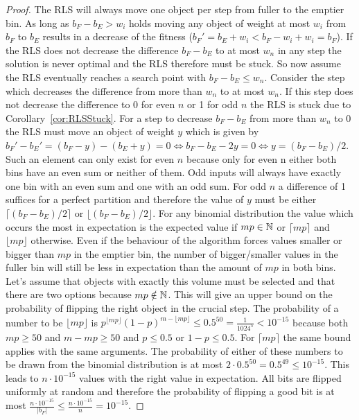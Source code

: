\begin{proof}
    The RLS will always move one object per step from fuller to the emptier bin.
    As long as $b_F-b_E>w_i$ holds moving any object of weight at most $w_i$ from $b_F$ to $b_E$ results in a decrease of the fitness ($b_F'=b_E+w_i<b_F-w_i+w_i=b_F$).
    If the RLS does not decrease the difference $b_F-b_E$ to at most $w_n$ in any step the solution is never optimal and the RLS therefore must be stuck.
    So now assume the RLS eventually reaches a search point with $b_F-b_E\le w_n$.
    Consider the step which decreases the difference from more than $w_n$ to at most $w_n$.
    If this step does not decrease the difference to 0 for even $n$ or 1 for odd $n$ the RLS is stuck due to Corollary~\ref{cor:RLSStuck}.
    For a step to decrease $b_F-b_E$ from more than $w_n$ to 0 the RLS must move an object of weight $y$ which is given by $b_F'-b_E'=(b_F-y)-(b_E+y)=0\Leftrightarrow b_F-b_E-2y=0\Leftrightarrow y=(b_F-b_E)/2$.
    Such an element can only exist for even $n$ because only for even n either both bins have an even sum or neither of them.
    Odd inputs will always have exactly one bin with an even sum and one with an odd sum.
    For odd $n$ a difference of 1 suffices for a perfect partition and therefore the value of $y$ must be either $\lceil(b_F-b_E)/2\rceil$ or $\lfloor(b_F-b_E)/2\rfloor$.
    For any binomial distribution the value which occurs the most in expectation is the expected value if $mp\in\mathbb{N}$ or $\lceil mp\rceil$ and $\lfloor mp\rfloor$ otherwise.
    Even if the behaviour of the algorithm forces values smaller or bigger than $mp$ in the emptier bin, the number of bigger/smaller values in the fuller bin will still be less in expectation than the amount of $mp$ in both bins.
    Let's assume that objects with exactly this volume must be selected and that there are two options because $mp\notin\mathbb{N}$.
    This will give an upper bound on the probability of flipping the right object in the crucial step.
    The probability of a number to be $\lfloor mp\rfloor$ is $p^{\lfloor mp\rfloor}{(1-p)}^{m-\lfloor mp\rfloor}\le0.5^{50}=\frac{1}{1024^5}<10^{-15}$ because both $mp\ge50$ and $m-mp\ge50$ and $p\le0.5$ or $1-p\le0.5$.
    For $\lceil mp\rceil$ the same bound applies with the same arguments.
    The probability of either of these numbers to be drawn from the binomial distribution is at most $2\cdot 0.5^{50}=0.5^{49}\le10^{-15}$.
    This leads to $n\cdot 10^{-15}$ values with the right value in expectation.
    All bits are flipped uniformly at random and therefore the probability of flipping a good bit is at most
    \(\frac{n\cdot 10^{-15}}{|b_F|}\le \frac{n\cdot 10^{-15}}{n} =10^{-15}\).
    


\end{proof}
